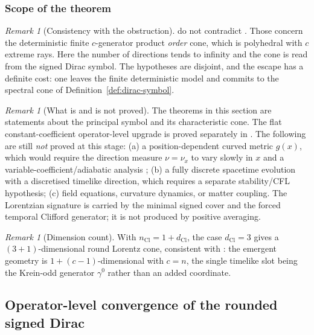 \documentclass[11pt]{article}
\theoremstyle{definition}
\theoremstyle{remark}
\newtheorem{remark}[theorem]{Remark}
\newcommand{\dCl}{d_{\mathrm{Cl}}}
\begin{document}
\subsubsection{Scope of the theorem}

\begin{remark}[Consistency with the obstruction]
\label{rem:no-contradiction}
 do not contradict
.  Those concern the deterministic
finite $c$-generator product \emph{order} cone, which is polyhedral with $c$
extreme rays.  Here the number of directions tends to infinity and the cone is
read from the signed Dirac symbol.  The hypotheses are disjoint, and the escape
has a definite cost: one leaves the finite deterministic model and commits to
the spectral cone of Definition~\ref{def:dirac-symbol}.
\end{remark}

\begin{remark}[What is and is not proved]
\label{rem:isotropisation-scope}
The theorems in this section are statements about the principal symbol and its
characteristic cone.  The flat constant-coefficient operator-level upgrade is
proved separately in .  The following are still
\emph{not} proved at this stage: \textup{(a)} a position-dependent curved metric
$g(x)$, which would require the direction measure $\nu=\nu_x$ to vary slowly in
$x$ and a variable-coefficient/adiabatic analysis ; \textup{(b)} a
fully discrete spacetime evolution with a discretised timelike direction, which
requires a separate stability/CFL hypothesis; \textup{(c)} field
equations, curvature dynamics, or matter coupling.  The Lorentzian signature is carried by the minimal signed cover and the
forced temporal Clifford generator; it is not produced by positive averaging.
\end{remark}

\begin{remark}[Dimension count]
\label{rem:isotropisation-dimension}
With $n_{\mathrm{Cl}}=1+\dCl$, the case $\dCl=3$ gives a $(3+1)$-dimensional round Lorentz cone,
consistent with : the emergent geometry is
$1+(c-1)$-dimensional with $c=n$, the single timelike slot being the Krein-odd
generator $\gamma^0$ rather than an added coordinate.
\end{remark}

\subsection{Operator-level convergence of the rounded signed Dirac}
\label{sec:operator-convergence}
\end{document}
